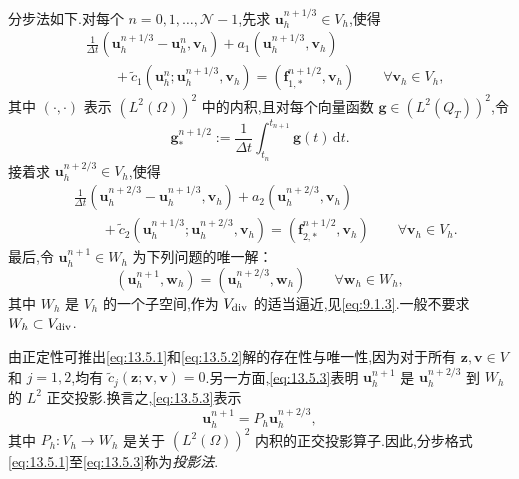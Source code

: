 分步法如下.对每个 \(n=0,1,\ldots,\mathcal N-1\),先求 \(\boldsymbol{u}_h^{n+1/3}\in V_h\),使得
\begin{equation}\label{eq:13.5.1}
  \begin{aligned}
    &\frac1{\Delta t}(\boldsymbol{u}_h^{n+1/3}-\boldsymbol{u}_h^n,\boldsymbol{v}_h)
       +a_1(\boldsymbol{u}_h^{n+1/3},\boldsymbol{v}_h)\\
    &\qquad+\widetilde c_1(\boldsymbol{u}_h^n;\boldsymbol{u}_h^{n+1/3},\boldsymbol{v}_h)
        =(\boldsymbol{f}_{1,*}^{n+1/2},\boldsymbol{v}_h)\qquad\forall\boldsymbol{v}_h\in V_h,
  \end{aligned}
\end{equation}
其中 \((\cdot,\cdot)\) 表示 \((L^2(\Omega))^2\) 中的内积,且对每个向量函数 \(\boldsymbol{g}\in(L^2(Q_T))^2\),令
\[
  \boldsymbol{g}_*^{n+1/2}:=\frac1{\Delta t}\int_{t_n}^{t_{n+1}}\boldsymbol{g}(t)\,\mathrm dt.
\]
接着求 \(\boldsymbol{u}_h^{n+2/3}\in V_h\),使得
\begin{equation}\label{eq:13.5.2}
  \begin{aligned}
    &\frac1{\Delta t}(\boldsymbol{u}_h^{n+2/3}-\boldsymbol{u}_h^{n+1/3},\boldsymbol{v}_h)
      +a_2(\boldsymbol{u}_h^{n+2/3},\boldsymbol{v}_h)\\
    &\qquad+\widetilde c_2(\boldsymbol{u}_h^{n+1/3};\boldsymbol{u}_h^{n+2/3},\boldsymbol{v}_h)
        =(\boldsymbol{f}_{2,*}^{n+1/2},\boldsymbol{v}_h)\qquad\forall\boldsymbol{v}_h\in V_h.
  \end{aligned}
\end{equation}
最后,令 \(\boldsymbol{u}_h^{n+1}\in W_h\) 为下列问题的唯一解：
\begin{equation}\label{eq:13.5.3}
  (\boldsymbol{u}_h^{n+1},\boldsymbol{w}_h)=(\boldsymbol{u}_h^{n+2/3},\boldsymbol{w}_h)
      \qquad\forall\boldsymbol{w}_h\in W_h,
\end{equation}
其中 \(W_h\) 是 \(V_h\) 的一个子空间,作为 \(V_{\rm div}\) 的适当逼近,见\eqref{eq:9.1.3}.一般不要求 \(W_h\subset V_{\rm div}\).

由正定性可推出\eqref{eq:13.5.1}和\eqref{eq:13.5.2}解的存在性与唯一性,因为对于所有 \(\boldsymbol{z},\boldsymbol{v}\in V\) 和 \(j=1,2\),均有 \(\widetilde c_j(\boldsymbol{z};\boldsymbol{v},\boldsymbol{v})=0\).另一方面,\eqref{eq:13.5.3}表明 \(\boldsymbol{u}_h^{n+1}\) 是 \(\boldsymbol{u}_h^{n+2/3}\) 到 \(W_h\) 的 \(L^2\) 正交投影.换言之,\eqref{eq:13.5.3}表示
\[
  \boldsymbol{u}_h^{n+1}=P_h\boldsymbol{u}_h^{n+2/3},
\]
其中 \(P_h\colon V_h\to W_h\) 是关于 \((L^2(\Omega))^2\) 内积的正交投影算子.因此,分步格式\eqref{eq:13.5.1}至\eqref{eq:13.5.3}称为\emph{投影法}.

